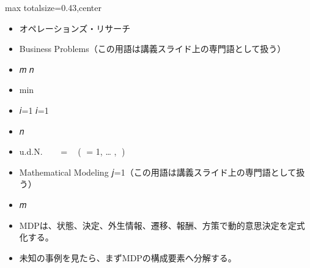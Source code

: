 \clearpage
{}
\begin{minipage}[t]{0.405\textwidth}
\begin{adjustbox}{max totalsize={\textwidth}{0.43\textheight},center}
\begin{minipage}{\textwidth}\scriptsize
{}\begin{itemize}
\item オペレーションズ・リサーチ
\item Business Problems（この用語は講義スライド上の専門語として扱う）
\item 𝑚 𝑛
\item min ෍ ෍ 𝑐𝑖𝑗 𝑥𝑖𝑗
\item 𝑖=1 𝑖=1
\item 𝑛
\item u.d.N. ෍ 𝑥𝑖𝑗 = 𝑎𝑖 (𝑖 = 1, … , 𝑚)
\item Mathematical Modeling 𝑗=1（この用語は講義スライド上の専門語として扱う）
\item 𝑚
\end{itemize}\begin{itemize}
\item MDPは、状態、決定、外生情報、遷移、報酬、方策で動的意思決定を定式化する。
\item 未知の事例を見たら、まずMDPの構成要素へ分解する。
\end{itemize}
\end{minipage}
\end{adjustbox}
\end{minipage}\hfill
